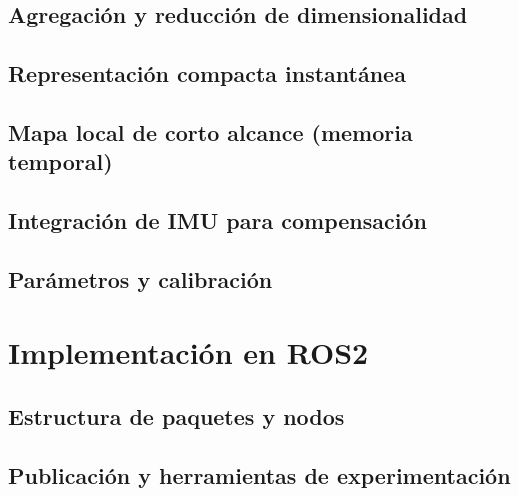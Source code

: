\section{Agregación y reducción de dimensionalidad}

\section{Representación compacta instantánea}

\section{Mapa local de corto alcance (memoria temporal)}

\section{Integración de IMU para compensación}

\section{Parámetros y calibración}

\chapter{Implementación en ROS2}

\section{Estructura de paquetes y nodos}

\section{Publicación y herramientas de experimentación}


